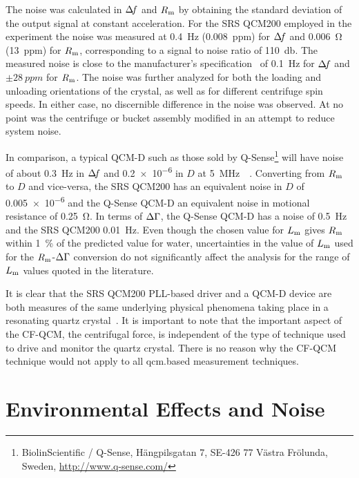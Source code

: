 The noise was calculated in $\Delta\!f$ and $R_\mathrm{m}$ by obtaining the standard
deviation of the output signal at constant acceleration.  For the SRS
QCM200 employed in the experiment the noise was measured at
\SI{0.4}{\hertz} (\SI{0.008}{ppm}) for $\Delta\!f$ and \SI{0.006}{\ohm}
(\SI{13}{ppm}) for $R_\mathrm{m}$, corresponding to a signal to noise ratio of
\SI{110}{\decibel}.  The measured noise is close to the manufacturer's
specification~\cite{srsqcm200manual} of \SI{0.1}{\hertz} for $\Delta\!f$ and
$\pm\SI{28}{ppm}$ for $R_\mathrm{m}$.  The noise was further analyzed for both the
loading and unloading orientations of the crystal, as well as for different
centrifuge spin speeds.  In either case, no discernible difference in the
noise was observed.  At no point was the centrifuge or bucket assembly
modified in an attempt to reduce system noise.

In comparison, a typical QCM-D such as those sold by
Q-Sense\footnote{BiolinScientific / Q-Sense, Hängpilsgatan 7, SE-426 77
  Västra Frölunda, Sweden,  \url{http://www.q-sense.com/}} will have noise of
about \SI{0.3}{\hertz} in $\Delta\!f$ and \num{0.2e-6} in $D$ at
\SI{5}{\mega\hertz}~\cite{su2005comparison}~\cite{peh2007understanding}.
Converting from $R_\mathrm{m}$ to $D$ and vice-versa, the SRS QCM200 has an
equivalent noise in $D$ of \num{0.005e-6} and the Q-Sense QCM-D an
equivalent noise in motional resistance of \SI{0.25}{\ohm}.  In terms of
$\Delta\Gamma$, the Q-Sense QCM-D has a noise of \SI{0.5}{\hertz} and the SRS QCM200
\SI{0.01}{\hertz}.  Even though the chosen value for $L_\mathrm{m}$ gives $R_\mathrm{m}$
within \SI{1}{\percent} of the predicted value for water, uncertainties in
the value of $L_\mathrm{m}$ used for the $R_\mathrm{m}$-$\Delta\Gamma$ conversion do not significantly
affect the analysis for the range of $L_\mathrm{m}$ values quoted in the literature.

It is clear that the SRS QCM200 PLL-based driver and a QCM-D device are
both measures of the same underlying physical phenomena taking place in a
resonating quartz crystal~\cite{geelhood2002transient}.  It is important to
note that the important aspect of the CF-QCM, the centrifugal force, is
independent of the type of technique used to drive and monitor the quartz
crystal.  There is no reason why the CF-QCM technique would not apply to
all \gls{qcm}.based measurement techniques.

\section{Environmental Effects and Noise}

